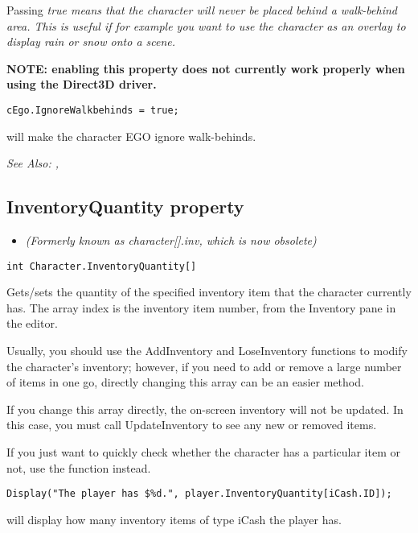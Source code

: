 Passing \it{true} means that the character will never be placed behind a walk-behind
area. This is useful if for example you want to use the character as an
overlay to display rain or snow onto a scene.

\bf{NOTE:} enabling this property does not currently work properly when using
the Direct3D driver.

\begin{verbatim}
cEgo.IgnoreWalkbehinds = true;
\end{verbatim}
will make the character EGO ignore walk-behinds.

\it{See Also:} ,


\subsection{InventoryQuantity property}\label{Character.InventoryQuantity}%

\begin{itemize}
\item \it{(Formerly known as character[].inv, which is now obsolete)}
\end{itemize}

\begin{verbatim}
int Character.InventoryQuantity[]
\end{verbatim}
Gets/sets the quantity of the specified inventory item that the character currently has.
The array index is the inventory item number, from the Inventory pane in the editor.

Usually, you should use the AddInventory and LoseInventory functions to modify the
character's inventory; however, if you need to add or remove a large number of items
in one go, directly changing this array can be an easier method.

If you change this array directly, the on-screen inventory will not be updated. In this
case, you must call UpdateInventory to see any new or removed items.

If you just want to quickly check whether the character has a particular item or
not, use the  function instead.

\begin{verbatim}
Display("The player has $%d.", player.InventoryQuantity[iCash.ID]);
\end{verbatim}
will display how many inventory items of type iCash the player has.

